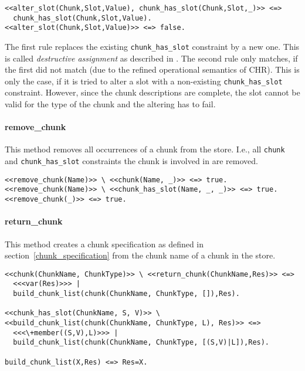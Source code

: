 \begin{lstlisting}
<<alter_slot(Chunk,Slot,Value), chunk_has_slot(Chunk,Slot,_)>> <=>
  chunk_has_slot(Chunk,Slot,Value).  
<<alter_slot(Chunk,Slot,Value)>> <=> false.
\end{lstlisting}

The first rule replaces the existing \lstinline|chunk_has_slot| constraint by a new one. This is called \emph{destructive assignment} as described in \cite[32]{fru_chr_book_2009}. The second rule only matches, if the first did not match (due to the refined operational semantics of CHR). This is only the case, if it is tried to alter a slot with a non-existing \lstinline|chunk_has_slot| constraint. However, since the chunk descriptions are complete, the slot cannot be valid for the type of the chunk and the altering has to fail.

\paragraph{remove\_chunk}

This method removes all occurrences of a chunk from the store. I.e., all \lstinline|chunk| and \lstinline|chunk_has_slot| constraints the chunk is involved in are removed.

\begin{lstlisting}
<<remove_chunk(Name)>> \ <<chunk(Name, _)>> <=> true.
<<remove_chunk(Name)>> \ <<chunk_has_slot(Name, _, _)>> <=> true.
<<remove_chunk(_)>> <=> true.
\end{lstlisting}

\paragraph{return\_chunk}

This method creates a chunk specification as defined in section~\ref{chunk_specification} from the chunk name of a chunk in the store.

\begin{lstlisting}[caption={rules for \texttt{return\_chunk}}]
<<chunk(ChunkName, ChunkType)>> \ <<return_chunk(ChunkName,Res)>> <=> 
  <<<var(Res)>>> | 
  build_chunk_list(chunk(ChunkName, ChunkType, []),Res).

<<chunk_has_slot(ChunkName, S, V)>> \ <<build_chunk_list(chunk(ChunkName, ChunkType, L), Res)>> <=> 
  <<<\+member((S,V),L)>>> | 
  build_chunk_list(chunk(ChunkName, ChunkType, [(S,V)|L]),Res).
  
build_chunk_list(X,Res) <=> Res=X.
\end{lstlisting}


